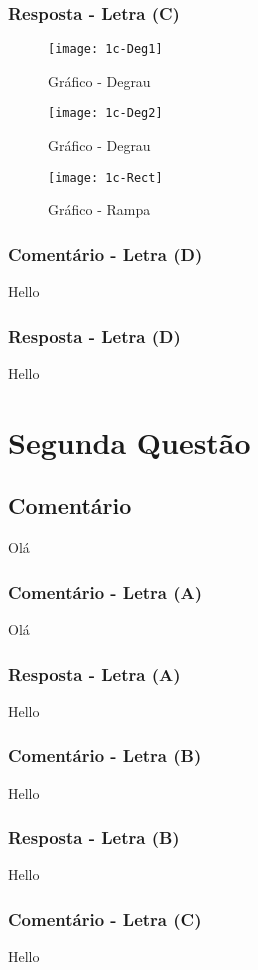 \documentclass[12pt, a4paper]{article}
\begin{document}
		\subsubsection{Resposta - Letra (C)}
			\begin{figure}[!ht]
				\centering
				\texttt{[image: 1c-Deg1]}
				\caption{Gráfico - Degrau}
			\end{figure}

			\begin{figure}[!ht]
				\centering
				\texttt{[image: 1c-Deg2]}
				\caption{Gráfico - Degrau}
			\end{figure}

			\begin{figure}[!ht]
				\centering
				\texttt{[image: 1c-Rect]}
				\caption{Gráfico - Rampa}
			\end{figure}
		\subsubsection{Comentário - Letra (D)}
			Hello	
		\subsubsection{Resposta - Letra (D)}
			Hello
\section{Segunda Questão}
	\subsection{Comentário}
		Olá
		\subsubsection{Comentário - Letra (A)}
			Olá
		\subsubsection{Resposta - Letra (A)}
			Hello
		\subsubsection{Comentário - Letra (B)}
			Hello
		\subsubsection{Resposta - Letra (B)}
			Hello
		\subsubsection{Comentário - Letra (C)}
			Hello	
\end{document}
